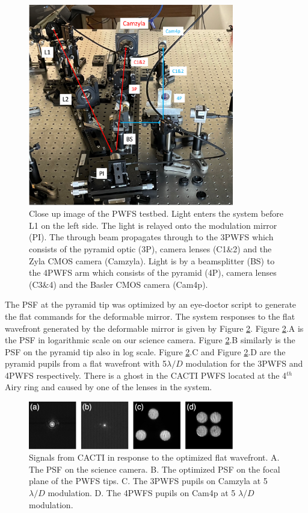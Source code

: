 \documentclass[12pt]{spieman}  %
\begin{document}
\begin{spacing}{2}
\begin{figure}
    \centering
    \includegraphics[width=0.8\textwidth]{PWFStestbed.png}
    \caption{Close up image of the PWFS testbed. Light enters the system before L1 on the left side. The light is relayed onto the modulation mirror (PI). The through beam propagates through to the 3PWFS which consists of the pyramid optic (3P), camera lenses (C1$\&$2) and the Zyla CMOS camera (Camzyla). Light is by a beamsplitter (BS) to the 4PWFS arm which consists of the pyramid (4P), camera lenses (C3$\&$4) and the Basler CMOS camera (Cam4p).  }
    \label{fig:PWFStestbed}
\end{figure}


The PSF at the pyramid tip was optimized by an eye-doctor script to generate the flat commands for the deformable mirror. The system responses to the flat wavefront generated by the deformable mirror is given by Figure \ref{fig:flatCACTI}. Figure \ref{fig:flatCACTI}.A is the PSF in logarithmic scale on our science camera. Figure \ref{fig:flatCACTI}.B similarly is the PSF on the pyramid tip also in log scale. Figure  \ref{fig:flatCACTI}.C and Figure \ref{fig:flatCACTI}.D are the pyramid pupils from a flat wavefront with 5$\lambda/D$ modulation for the 3PWFS and 4PWFS respectively. There is a ghost in the CACTI PWFS located at the 4$^{th}$ Airy ring and caused by one of the lenses in the system. 

\begin{figure}
    \centering
    \includegraphics[width=0.8\textwidth]{flatCACTI.png}
    \caption{Signals from CACTI in response to the optimized flat wavefront. A. The PSF on the science camera. B. The optimized PSF on the focal plane of the PWFS tips. C. The 3PWFS pupils on Camzyla at 5 $\lambda/D$ modulation. D. The 4PWFS pupils on Cam4p at 5 $\lambda/D$ modulation.}
    \label{fig:flatCACTI}
\end{figure}



\end{spacing}
\end{document}
